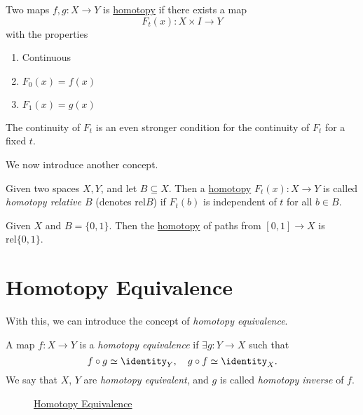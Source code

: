 \begin{prev}
	Two maps \(f, g\colon X\to Y\) is \hyperref[def:homotopy]{homotopy} if there exists a map
	\[
		F_t(x)\colon X\times I\to Y
	\]
	with the properties
	\begin{enumerate}
		\item Continuous
		\item \(F_0(x) = f(x)\)
		\item \(F_1(x) = g(x)\)
	\end{enumerate}
	\begin{remark}
		The continuity of \(F_t\) is an even stronger condition for the continuity of \(F_t\) for a fixed \(t\).
	\end{remark}
\end{prev}

We now introduce another concept.
\begin{definition}\label{def:homotopy-relative}
	Given two spaces \(X, Y\), and let \(B\subseteq X\). Then a \hyperref[def:homotopy]{homotopy} \(F_t(x)\colon X\to Y\) is called
	\emph{homotopy relative \(B\)} (denotes \(\mathrm{rel} B\)) if \(F_t(b)\) is independent of \(t\) for all \(b\in B\).
\end{definition}

\begin{eg}
	Given \(X\) and \(B = \{0, 1\}\). Then the \hyperref[def:homotopy]{homotopy} of paths from \([0, 1]\to X\) is
	\(\mathrm{rel} \{0, 1\}\).
	\begin{figure}[H]
		\centering
		\label{fig:eg:rel-homotopy}
	\end{figure}
\end{eg}

\section{Homotopy Equivalence}
With this, we can introduce the concept of \emph{homotopy equivalence}.
\begin{definition}\label{def:homotopy-equivalence}\label{def:homotopy-inverse}
	A map \(f\colon X\to Y\) is a \emph{homotopy equivalence} if \(\exists g\colon Y\to X\) such that
	\[
		f\circ g \simeq \identity_Y, \quad g\circ f \simeq \identity_X.
	\]
	We say that \(X\), \(Y\) are \emph{homotopy equivalent}, and \(g\) is called \emph{homotopy inverse} of \(f\).

	\begin{figure}[H]
		\centering
		\caption{\hyperref[def:homotopy-equivalence]{Homotopy Equivalence}}
		\label{fig:def:homotopy-equivalence}
	\end{figure}
\end{definition}

